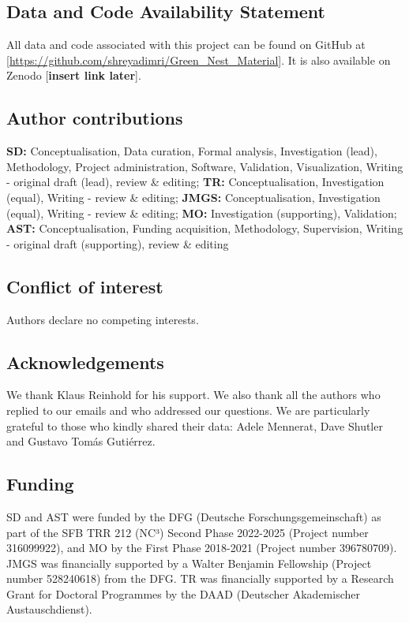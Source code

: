 \documentclass[
  number,
  review,
  onecolumn]{elsarticle}
\begin{document}
\subsection{Data and Code Availability
Statement}\label{data-and-code-availability-statement}

All data and code associated with this project can be found on GitHub at
{[}\url{https://github.com/shreyadimri/Green_Nest_Material}{]}. It is
also available on Zenodo {[}\textbf{insert link later}{]}.

\subsection{Author contributions}\label{author-contributions}

\textbf{SD:} Conceptualisation, Data curation, Formal analysis,
Investigation (lead), Methodology, Project administration, Software,
Validation, Visualization, Writing - original draft (lead), review \&
editing; \textbf{TR:} Conceptualisation, Investigation (equal), Writing
- review \& editing; \textbf{JMGS:} Conceptualisation, Investigation
(equal), Writing - review \& editing; \textbf{MO:} Investigation
(supporting), Validation; \textbf{AST:} Conceptualisation, Funding
acquisition, Methodology, Supervision, Writing - original draft
(supporting), review \& editing

\subsection{Conflict of interest}\label{conflict-of-interest}

Authors declare no competing interests.

\subsection{Acknowledgements}\label{acknowledgements}

We thank Klaus Reinhold for his support. We also thank all the authors
who replied to our emails and who addressed our questions. We are
particularly grateful to those who kindly shared their data: Adele
Mennerat, Dave Shutler and Gustavo Tomás Gutiérrez.

\subsection{Funding}\label{funding}

SD and AST were funded by the DFG (Deutsche Forschungsgemeinschaft) as
part of the SFB TRR 212 (NC³) Second Phase 2022-2025 (Project number
316099922), and MO by the First Phase 2018-2021 (Project number
396780709). JMGS was financially supported by a Walter Benjamin
Fellowship (Project number 528240618) from the DFG. TR was financially
supported by a Research Grant for Doctoral Programmes by the DAAD
(Deutscher Akademischer Austauschdienst).
\end{document}
